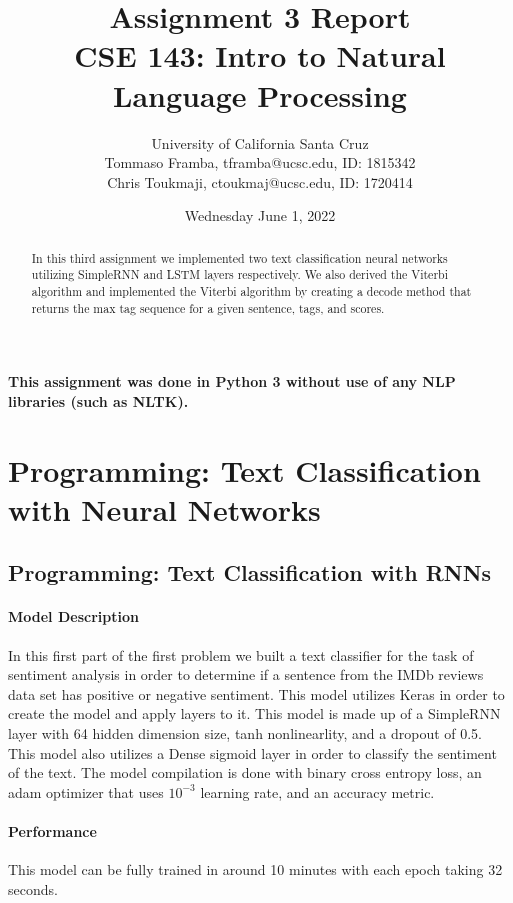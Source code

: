 \documentclass[11pt,letterpaper]{article}
\title{Assignment 3 Report\\ CSE 143:  Intro to Natural Language Processing}
\author{University of California Santa Cruz \\ 
Tommaso Framba, tframba@ucsc.edu, ID: 1815342\\
Chris Toukmaji, ctoukmaj@ucsc.edu, ID: 1720414
\vspace{-2ex}}
\date{Wednesday June 1, 2022}
\begin{document}
\maketitle

\begin{center}
\textbf{
This assignment was done in Python 3 without use of any NLP libraries (such as NLTK).
}
\end{center}

\begin{abstract}
In this third assignment we implemented two text classification neural networks utilizing SimpleRNN and LSTM layers respectively. We also derived the Viterbi algorithm and implemented the Viterbi algorithm by creating a decode method that returns the max tag sequence for a given sentence, tags, and scores.  


\end{abstract}


\section{Programming: Text Classification with Neural Networks}

\subsection{Programming: Text Classification with RNNs}

\paragraph{Model Description}
In this first part of the first problem we built a text classifier for the task of sentiment analysis in order to determine if a sentence from the IMDb reviews data set has positive or negative sentiment. This model utilizes Keras in order to create the model and apply layers to it. This model is made up of a SimpleRNN layer with 64 hidden dimension size, tanh nonlinearlity, and a dropout of 0.5. This model also utilizes a Dense sigmoid layer in order to classify the sentiment of the text. The model compilation is done with binary cross entropy loss, an adam optimizer that uses $10^{-3}$ learning rate, and an accuracy metric.


\paragraph{Performance} This model can be fully trained in around 10 minutes with each epoch taking 32 seconds. 
\end{document}
